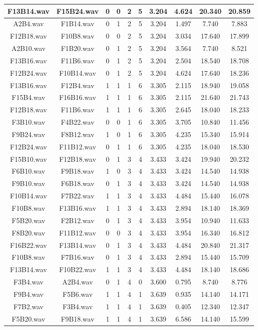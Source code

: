 \documentclass[11pt,a4paper]{book}
\begin{document}
\begin{longtable}[c]{|c|c|c|c|c|c|c|c|c|c|}
F13B14.wav&F15B24.wav&0&0&2&5&3.204&4.624&20.340&20.859\\ \hline
A2B4.wav&F1B14.wav&0&1&2&5&3.204&1.497&7.740&7.883\\ \hline
F12B18.wav&F10B8.wav&0&0&2&5&3.204&3.034&17.640&17.899\\ \hline
A2B10.wav&F1B20.wav&0&1&2&5&3.204&3.564&7.740&8.521\\ \hline
F13B16.wav&F11B6.wav&0&1&2&5&3.204&2.504&18.540&18.708\\ \hline
F12B24.wav&F10B14.wav&0&1&2&5&3.204&4.624&17.640&18.236\\ \hline
F13B16.wav&F12B4.wav&1&1&1&6&3.305&2.115&18.940&19.058\\ \hline
F15B4.wav&F16B16.wav&1&1&1&6&3.305&2.115&21.640&21.743\\ \hline
F12B18.wav&F11B6.wav&1&1&1&6&3.305&2.645&18.040&18.233\\ \hline
F3B10.wav&F4B22.wav&0&0&1&6&3.305&3.705&10.840&11.456\\ \hline
F9B24.wav&F8B12.wav&1&0&1&6&3.305&4.235&15.340&15.914\\ \hline
F12B24.wav&F11B12.wav&0&1&1&6&3.305&4.235&18.040&18.530\\ \hline
F15B10.wav&F12B18.wav&0&1&3&4&3.433&3.424&19.940&20.232\\ \hline
F6B10.wav&F9B18.wav&1&0&3&4&3.433&3.424&14.540&14.938\\ \hline
F9B10.wav&F6B18.wav&0&1&3&4&3.433&3.424&14.540&14.938\\ \hline
F10B14.wav&F7B22.wav&1&1&3&4&3.433&4.484&15.440&16.078\\ \hline
F10B8.wav&F13B16.wav&1&1&3&4&3.433&2.894&18.140&18.369\\ \hline
F5B20.wav&F2B12.wav&0&1&3&4&3.433&3.954&10.940&11.633\\ \hline
F8B20.wav&F11B12.wav&0&0&3&4&3.433&3.954&16.340&16.812\\ \hline
F16B22.wav&F13B14.wav&0&1&3&4&3.433&4.484&20.840&21.317\\ \hline
F10B8.wav&F7B16.wav&0&1&3&4&3.433&2.894&15.440&15.709\\ \hline
F13B14.wav&F10B22.wav&1&1&3&4&3.433&4.484&18.140&18.686\\ \hline
F3B4.wav&A2B4.wav&0&1&4&0&3.600&0.795&8.740&8.776\\ \hline
F9B4.wav&F5B6.wav&1&1&4&1&3.639&0.935&14.140&14.171\\ \hline
F7B2.wav&F3B4.wav&1&1&4&1&3.639&0.405&12.340&12.347\\ \hline
F5B20.wav&F9B18.wav&1&1&4&1&3.639&6.586&14.140&15.599\\ \hline

\end{longtable}
\end{document}
